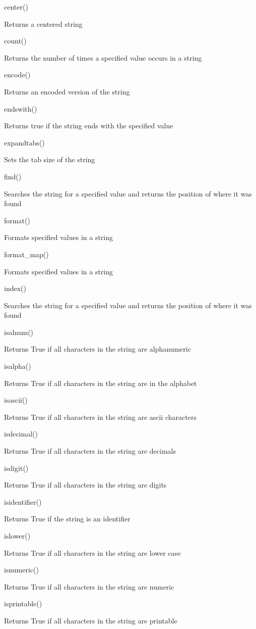 \documentclass[
  letterpaper,
  DIV=11,
  numbers=noendperiod]{scrreprt}
\begin{document}
center()

Returns a centered string

count()

Returns the number of times a specified value occurs in a string

encode()

Returns an encoded version of the string

endswith()

Returns true if the string ends with the specified value

expandtabs()

Sets the tab size of the string

find()

Searches the string for a specified value and returns the position of
where it was found

format()

Formats specified values in a string

format\_map()

Formats specified values in a string

index()

Searches the string for a specified value and returns the position of
where it was found

isalnum()

Returns True if all characters in the string are alphanumeric

isalpha()

Returns True if all characters in the string are in the alphabet

isascii()

Returns True if all characters in the string are ascii characters

isdecimal()

Returns True if all characters in the string are decimals

isdigit()

Returns True if all characters in the string are digits

isidentifier()

Returns True if the string is an identifier

islower()

Returns True if all characters in the string are lower case

isnumeric()

Returns True if all characters in the string are numeric

isprintable()

Returns True if all characters in the string are printable
\end{document}
